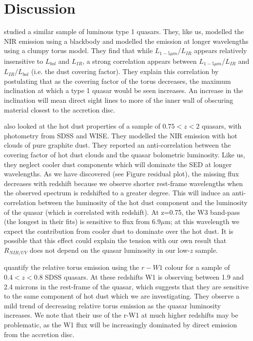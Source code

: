 \section{Discussion}

\citet{roseboom13} studied a similar sample of luminous type 1 quasars. 
They, like us, modelled the NIR emission using a blackbody and modelled the emission at longer wavelengths using a clumpy torus model. 
They find that while $L_{1-5\mu m}$/$L_{IR}$ appears relatively insensitive to $L_{bol}$ and $L_{IR}$, a strong correlation appears between $L_{1-5\mu m}$/$L_{IR}$ and $L_{IR}/L_{bol}$ (i.e. the dust covering factor). 
They explain this correlation by postulating that as the covering factor of the torus decreases, the maximum inclination at which a type 1 quasar would be seen increases. 
An increase in the inclination will mean direct sight lines to more of the inner wall of obscuring material closest to the accretion disc.

\citet{mor11} also looked at the hot dust properties of a sample of $0.75 < z < 2$ quasars, with photometry from SDSS and WISE. 
They modelled the NIR emission with hot clouds of pure graphite dust. 
They reported an anti-correlation between the covering factor of hot dust clouds and the quasar bolometric luminosity. 
Like us, they neglect cooler dust components which will dominate the SED at longer wavelengths. 
As we have discovered (see Figure residual plot), the missing flux decreases with redshift because we observe shorter rest-frame wavelengths when the observed spectrum is redshifted to a greater degree. 
This will induce an anti-correlation between the luminosity of the hot dust component and the luminosity of the quasar (which is correlated with redshift). 
At z=0.75, the W3 band-pass (the longest in their fits) is sensitive to flux from 6.9$\mu$m; at this wavelength we expect the contribution from cooler dust to dominate over the hot dust. 
It is possible that this effect could explain the tension with our own result that $R_{NIR/UV}$ does not depend on the quasar luminosity in our low-$z$ sample. 

\citet{shen14} quantify the relative torus emission using the $r-W1$ colour for a sample of $0.4 < z < 0.8$ SDSS quasars. 
At these redshifts W1 is observing between 1.9 and 2.4 microns in the rest-frame of the quasar, which suggests that they are sensitive to the same component of hot dust which we are investigating. 
They observe a mild trend of decreasing relative torus emission as the quasar luminosity increases. 
We note that their use of the r-W1 at much higher redshifts may be problematic, as the W1 flux will be increasingly dominated by direct emission from the accretion disc. 

